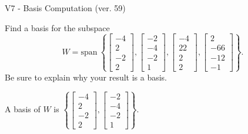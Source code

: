 \begin{exercise}
  \begin{exerciseTitle}V7 - Basis Computation (ver. 59)\end{exerciseTitle}
  \begin{exerciseStatement}
    Find a basis for the subspace 
\[W=\mathrm{span}\ \left\{\left[\begin{array}{r}
-4 \\
2 \\
-2 \\
2
\end{array}\right] , \left[\begin{array}{r}
-2 \\
-4 \\
-2 \\
1
\end{array}\right] , \left[\begin{array}{r}
-4 \\
22 \\
2 \\
2
\end{array}\right] , \left[\begin{array}{r}
2 \\
-66 \\
-12 \\
-1
\end{array}\right]\right\}.\]
 Be sure to explain why your result is a basis.


  \end{exerciseStatement}
  \begin{exerciseAnswer}
   A basis of \(W\) is  \(\left\{\left[\begin{array}{r}
-4 \\
2 \\
-2 \\
2
\end{array}\right] , \left[\begin{array}{r}
-2 \\
-4 \\
-2 \\
1
\end{array}\right]\right\}\).
  


  \end{exerciseAnswer}
\end{exercise}